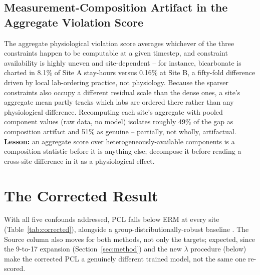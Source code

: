 \documentclass[pmlr,twocolumn,10pt]{jmlr} %
\begin{document}
\subsection{Measurement-Composition Artifact in the Aggregate Violation Score}
The aggregate physiological violation score averages whichever of the three
constraints happen to be computable at a given timestep, and constraint
availability is highly uneven and site-dependent -- for instance,
bicarbonate is charted in 8.1\% of Site A stay-hours versus 0.16\% at Site
B, a fifty-fold difference driven by local lab-ordering practice, not
physiology. Because the sparser constraints also occupy a different residual
scale than the dense ones, a site's aggregate mean partly tracks which labs
are ordered there rather than any physiological difference. Recomputing
each site's aggregate with pooled component values (raw data, no model)
isolates roughly 49\% of the gap as composition artifact and 51\% as
genuine -- partially, not wholly, artifactual. \textbf{Lesson:} an aggregate score
over heterogeneously-available components is a composition statistic
before it is anything else; decompose it before reading a cross-site
difference in it as a physiological effect.

\section{The Corrected Result}
\label{sec:corrected}

With all five confounds addressed, PCL falls below ERM at every site
(Table~\ref{tab:corrected}), alongside a group-distributionally-robust
baseline \citep{sagawa2020distributionally}. The Source column also moves
for both methods, not only the targets; expected, since the 9-to-17
expansion (Section~\ref{sec:method}) and the new $\lambda$ procedure
(below) make the corrected PCL a genuinely different trained model, not
the same one re-scored.
\end{document}
